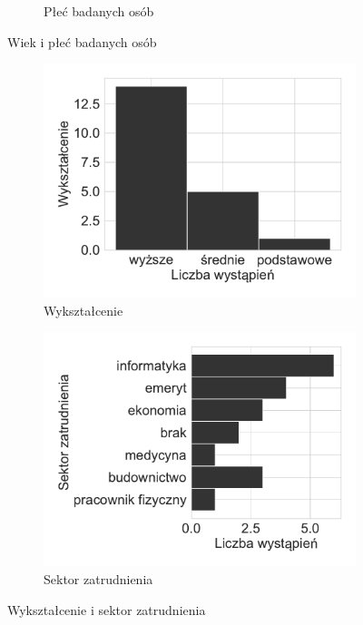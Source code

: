 \documentclass{./assets/wfis}
\begin{document}
\begin{figure}[h!]
\begin{subfigure}[b]{0.45\textwidth}
    \caption{Płeć badanych osób}
    \label{fig:gender}
\end{subfigure}
\caption{Wiek i płeć badanych osób}
\end{figure}

\begin{figure}[h!]
\begin{subfigure}[b]{0.4\textwidth}
    \centering
    \includegraphics[width=\columnwidth]{plots/education.pdf}
    \caption{Wykształcenie}
    \label{fig:education}
\end{subfigure}   
\hfill
\begin{subfigure}[b]{0.5\textwidth}
    \centering
    \includegraphics[width=\columnwidth]{plots/job.pdf}
    \caption{Sektor zatrudnienia}
    \label{fig:jobs}
\end{subfigure}
\caption{Wykształcenie i sektor zatrudnienia}
\end{figure}
\end{document}
